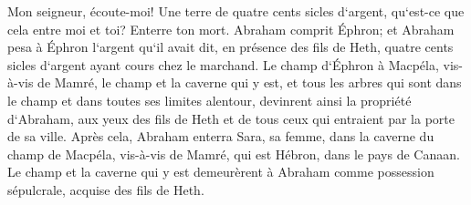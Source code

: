 \verse Mon seigneur, écoute-moi! Une terre de quatre cents sicles d`argent, qu`est-ce que cela entre moi et toi? Enterre ton mort. 
\verse Abraham comprit Éphron; et Abraham pesa à Éphron l`argent qu`il avait dit, en présence des fils de Heth, quatre cents sicles d`argent ayant cours chez le marchand. 
\verse Le champ d`Éphron à Macpéla, vis-à-vis de Mamré, le champ et la caverne qui y est, et tous les arbres qui sont dans le champ et dans toutes ses limites alentour, 
\verse devinrent ainsi la propriété d`Abraham, aux yeux des fils de Heth et de tous ceux qui entraient par la porte de sa ville. 
\verse Après cela, Abraham enterra Sara, sa femme, dans la caverne du champ de Macpéla, vis-à-vis de Mamré, qui est Hébron, dans le pays de Canaan. 
\verse Le champ et la caverne qui y est demeurèrent à Abraham comme possession sépulcrale, acquise des fils de Heth. 

